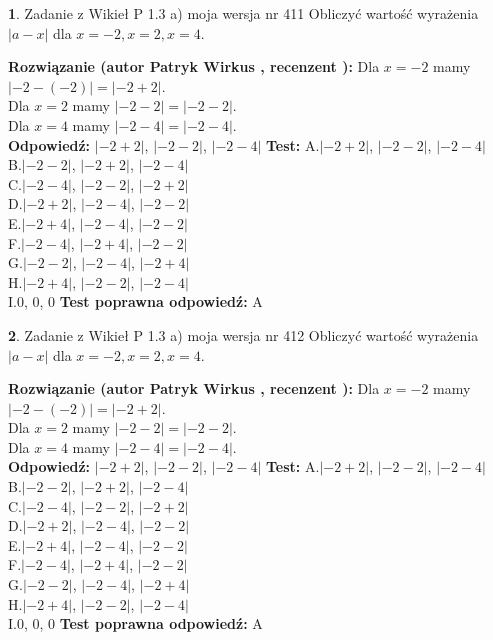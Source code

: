 \documentclass[12pt, a4paper]{article}
\theoremstyle{definition} %
\newtheorem{zad}{}
\newcommand{\zadStart}[1]{\begin{zad}#1\newline}
\newcommand{\zadStop}{\end{zad}}
\newcommand{\rozwStart}[2]{\noindent \textbf{Rozwiązanie (autor #1 , recenzent #2): }\newline}
\newcommand{\rozwStop}{\newline}
\newcommand{\odpStart}{\noindent \textbf{Odpowiedź:}\newline}
\newcommand{\odpStop}{\newline}
\newcommand{\testStart}{\noindent \textbf{Test:}\newline}
\newcommand{\testStop}{\newline}
\newcommand{\kluczStart}{\noindent \textbf{Test poprawna odpowiedź:}\newline}
\newcommand{\kluczStop}{\newline}
\begin{document}
\zadStart{Zadanie z Wikieł P 1.3 a) moja wersja nr 411}
Obliczyć wartość wyrażenia $|a - x|$ dla $x=-2,x=2,x=4$.
\zadStop
\rozwStart{Patryk Wirkus}{}
Dla $x = -2$ mamy $|-2 - (-2)| = |-2 + 2|$.\\
Dla $x = 2$ mamy $|-2 - 2| = |-2 - 2|$.\\
Dla $x = 4$ mamy $|-2 - 4| = |-2 - 4|$.\\
\rozwStop
\odpStart
$|-2 + 2|$, $|-2 - 2|$, $|-2 - 4|$
\odpStop
\testStart
A.$|-2 + 2|$, $|-2 - 2|$, $|-2 - 4|$\\
B.$|-2 - 2|$, $|-2 + 2|$, $|-2 - 4|$\\
C.$|-2 - 4|$, $|-2 - 2|$, $|-2 + 2|$\\
D.$|-2 + 2|$, $|-2 - 4|$, $|-2 - 2|$\\
E.$|-2 + 4|$, $|-2 - 4|$, $|-2 - 2|$\\
F.$|-2 - 4|$, $|-2 + 4|$, $|-2 - 2|$\\
G.$|-2 - 2|$, $|-2 - 4|$, $|-2 + 4|$\\
H.$|-2 + 4|$, $|-2 - 2|$, $|-2 - 4|$\\
I.$0$, $0$, $0$
\testStop
\kluczStart
A
\kluczStop



\zadStart{Zadanie z Wikieł P 1.3 a) moja wersja nr 412}
Obliczyć wartość wyrażenia $|a - x|$ dla $x=-2,x=2,x=4$.
\zadStop
\rozwStart{Patryk Wirkus}{}
Dla $x = -2$ mamy $|-2 - (-2)| = |-2 + 2|$.\\
Dla $x = 2$ mamy $|-2 - 2| = |-2 - 2|$.\\
Dla $x = 4$ mamy $|-2 - 4| = |-2 - 4|$.\\
\rozwStop
\odpStart
$|-2 + 2|$, $|-2 - 2|$, $|-2 - 4|$
\odpStop
\testStart
A.$|-2 + 2|$, $|-2 - 2|$, $|-2 - 4|$\\
B.$|-2 - 2|$, $|-2 + 2|$, $|-2 - 4|$\\
C.$|-2 - 4|$, $|-2 - 2|$, $|-2 + 2|$\\
D.$|-2 + 2|$, $|-2 - 4|$, $|-2 - 2|$\\
E.$|-2 + 4|$, $|-2 - 4|$, $|-2 - 2|$\\
F.$|-2 - 4|$, $|-2 + 4|$, $|-2 - 2|$\\
G.$|-2 - 2|$, $|-2 - 4|$, $|-2 + 4|$\\
H.$|-2 + 4|$, $|-2 - 2|$, $|-2 - 4|$\\
I.$0$, $0$, $0$
\testStop
\kluczStart
A
\kluczStop
\end{document}
